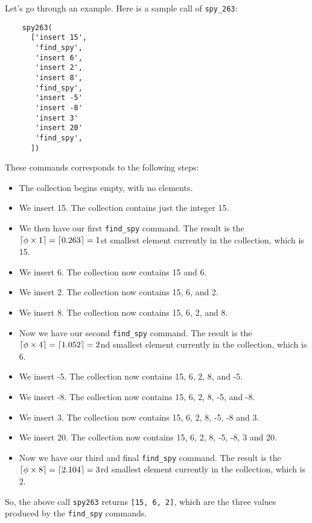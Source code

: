 \documentclass{assignment-263}
\begin{document}
\begin{enumerate}
    Let's go through an example. Here is a sample call of \verb|spy_263|:
    \begin{verbatim}
    spy263(
      ['insert 15',
       'find_spy',
       'insert 6',
       'insert 2',
       'insert 8',
       'find_spy',
       'insert -5'
       'insert -8'
       'insert 3'
       'insert 20'
       'find_spy',
      ])
    \end{verbatim}
    These commands corresponds to the following steps:
    \begin{itemize}
    \item The collection begins empty, with no elements.
    \item We insert 15. The collection contains just the integer 15.
    \item We then have our first \verb|find_spy| command. The result is the $\left \lceil \phi\times 1 \right \rceil = \left \lceil 0.263 \right \rceil = 1$st
          smallest element currently in the collection, which is 15.
    \item We insert 6. The collection now contains 15 and 6.
    \item We insert 2. The collection now contains 15, 6, and 2.
    \item We insert 8. The collection now contains 15, 6, 2, and 8.
    \item Now we have our second \verb|find_spy| command. The result is the $\left \lceil \phi\times 4 \right \rceil  = \left \lceil 1.052 \right \rceil = 2$nd
          smallest element currently in the collection, which is 6.
    \item We insert -5. The collection now contains 15, 6, 2, 8, and -5.
    \item We insert -8. The collection now contains 15, 6, 2, 8, -5, and -8.
    \item We insert 3. The collection now contains 15, 6, 2, 8, -5, -8 and 3.
    \item We insert 20. The collection now contains 15, 6, 2, 8, -5, -8, 3 and 20.
    \item Now we have our third and final \verb|find_spy| command. The result is the $\left \lceil \phi\times 8 \right \rceil = \left \lceil 2.104 \right \rceil = 3$rd
          smallest element currently in the collection, which is 2.
    \end{itemize}

    So, the above call \verb|spy263| returns \verb|[15, 6, 2]|, which
    are the three values produced by the \verb|find_spy| commands.
  

\end{enumerate}
\end{document}
